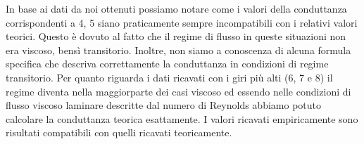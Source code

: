 
In base ai dati da noi ottenuti possiamo notare come i valori della conduttanza corrispondenti a 4, 5 siano praticamente sempre incompatibili con i relativi valori teorici. Questo è dovuto al fatto che il regime di flusso in queste situazioni non era viscoso, bensì transitorio. Inoltre, non siamo a conoscenza di alcuna formula specifica che descriva correttamente la conduttanza in condizioni di regime transitorio.
Per quanto riguarda i dati ricavati con i giri più alti (6, 7 e 8) il regime diventa nella maggiorparte dei casi viscoso ed essendo nelle condizioni di flusso viscoso laminare descritte dal numero di Reynolds abbiamo potuto calcolare la conduttanza teorica esattamente. I valori ricavati empiricamente sono risultati compatibili con quelli ricavati teoricamente. %

